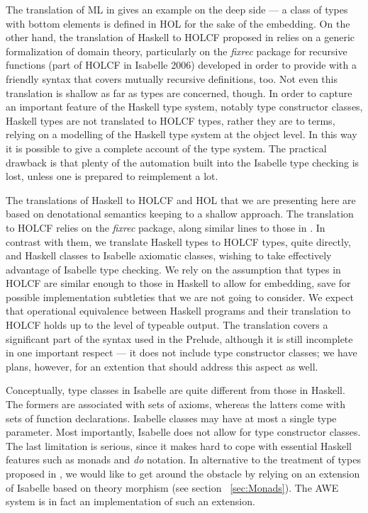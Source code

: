 \documentclass[a4paper,12pt]{article}
\begin{document}
The translation of ML in \cite{Pollack} gives an example on the deep
side --- a class of types with bottom elements is defined in HOL for
the sake of the embedding. On the other hand, the translation of
Haskell to HOLCF proposed in \cite{Huff} relies on a generic
formalization of domain theory, particularly on the \emph{fixrec}
package for recursive functions (part of HOLCF in Isabelle 2006)
developed in order to provide with a friendly syntax that covers
mutually recursive definitions, too. Not even this translation is
shallow as far as types are concerned, though. In order to capture an
important feature of the Haskell type system, notably type constructor
classes, Haskell types are not translated to HOLCF types, rather they
are to terms, relying on a modelling of the Haskell type system at the
object level.  In this way it is possible to give a complete account
of the type system. The practical drawback is that plenty of the
automation built into the Isabelle type checking is lost, unless one
is prepared to reimplement a lot.

The translations of Haskell to HOLCF and HOL that we are presenting
here are based on denotational semantics keeping to a shallow
approach. The translation to HOLCF relies on the \emph{fixrec}
package, along similar lines to those in \cite{Huff}. In contrast with
them, we translate Haskell types to HOLCF types, quite directly, and
Haskell classes to Isabelle axiomatic classes, wishing to take
effectively advantage of Isabelle type checking. We rely on the
assumption that types in HOLCF are similar enough to those in Haskell
to allow for embedding, save for possible implementation subtleties
that we are not going to consider. We expect that operational
equivalence between Haskell programs and their translation to HOLCF
holds up to the level of typeable output.  The translation covers a
significant part of the syntax used in the Prelude, although it is
still incomplete in one important respect --- it does not include type
constructor classes; we have plans, however, for an extention that
should address this aspect as well.

Conceptually, type classes in Isabelle are quite different from those
in Haskell. The formers are associated with sets of axioms, whereas
the latters come with sets of function declarations.  Isabelle classes
may have at most a single type parameter.  Most importantly, Isabelle
does not allow for type constructor classes. The last limitation is
serious, since it makes hard to cope with essential Haskell features
such as monads and \emph{do} notation.  In alternative to the
treatment of types proposed in \cite{Huff}, we would like to get
around the obstacle by relying on an extension of Isabelle based on
theory morphism (see section~ \ref{sec:Monads}). The AWE system \cite{AWE}
is in fact an implementation of such an extension.
\end{document}
